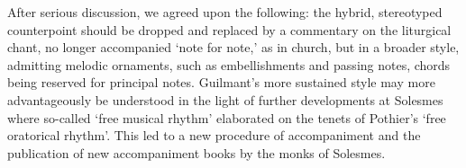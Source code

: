   {\cite[54]{VierneMessouvenirs1970}}
{After serious discussion, we agreed upon the following: the hybrid, stereotyped counterpoint should be dropped and replaced by a commentary on the liturgical chant, no longer accompanied `note for note,' as in church, but in a broader style, admitting melodic ornaments, such as embellishments and passing notes, chords being reserved for principal notes.}
  {\cite[121, 123]{SmithLouisVierneOrganist2009}}
\noindent
Guilmant's more sustained style may more advantageously be understood in the light of further developments at Solesmes where so-called `free musical rhythm' elaborated on the tenets of Pothier's `free oratorical rhythm'.
This led to a new procedure of accompaniment and the publication of new accompaniment books by the monks of Solesmes.

